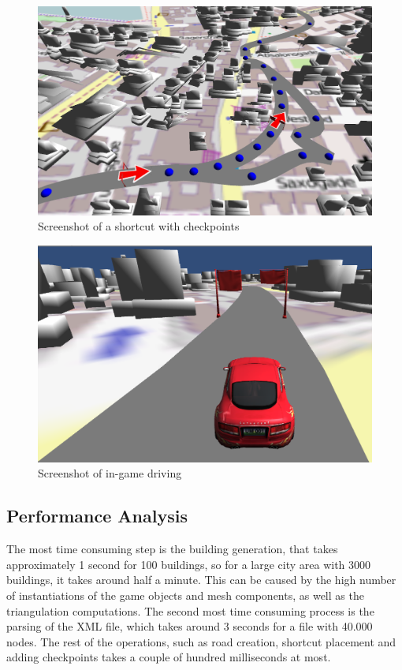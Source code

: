 \documentclass[conference]{IEEEtran}
\begin{document}
\begin{figure}[h!t]
\centering
\includegraphics[scale=0.3]{images/Checkpoints1.png}
\caption{\label{buildings} Screenshot of a shortcut with checkpoints}
\end{figure}

\begin{figure}[h!t]
\centering
\includegraphics[scale=0.3]{images/Car1.png}
\caption{\label{buildings} Screenshot of in-game driving}
\end{figure}

\subsection{Performance Analysis}

The most time consuming step is the building generation, that takes approximately 1 second for 100 buildings, so for a large city area with 3000 buildings, it takes around half a minute. This can be caused by the high number of instantiations of the game objects and mesh components, as well as the triangulation computations. The second most time consuming process is the parsing of the XML file, which takes around 3 seconds for a file with 40.000 nodes. The rest of the operations, such as road creation, shortcut placement and adding checkpoints takes a couple of hundred milliseconds at most.
\end{document}
